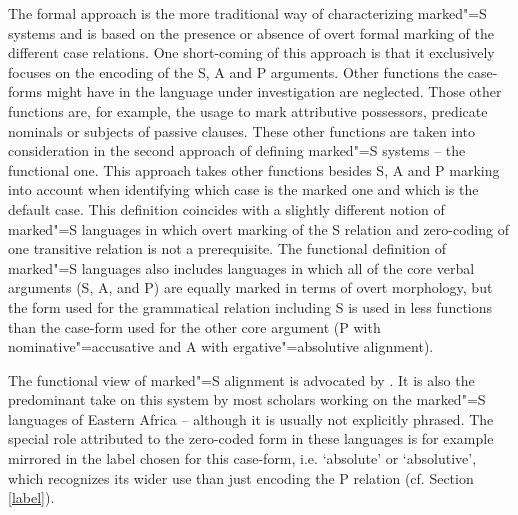 The formal approach is the more traditional way of characterizing marked"=S systems and is based on the presence or absence of overt formal marking of the different case relations. 
One short-coming of this approach is that it exclusively focuses on the encoding of the S, A and P arguments. Other functions the case-forms might have in the language under investigation are neglected. 
Those other functions are, for example, the usage to mark attributive possessors, predicate nominals or subjects of passive clauses. 
These other functions are taken into consideration in the second approach of defining marked"=S systems -- the functional one. 
This approach takes other functions besides S, A and P marking into account when identifying which case is the marked one and which is the default case. 
This definition coincides with a slightly different notion of marked"=S languages in which overt marking of the S relation and zero-coding of one transitive relation is not a prerequisite. 
The functional definition of marked"=S languages also includes languages in which all of the core verbal arguments (S, A, and P) are equally marked in terms of overt morphology, but the form used for the grammatical relation including S is used in less functions than the case-form used for the other core argument (P with nominative"=accusative and A with ergative"=absolutive alignment). 

The functional view of marked"=S alignment is advocated by \citet{Koenig:2006}. 
It is also the predominant take on this system by most scholars working on the marked"=S languages of Eastern Africa -- although it is usually not explicitly phra\-sed. 
The special role attributed to the zero-coded form in these languages is for example mirrored in the label chosen for this case-form, i.e. `absolute' or `absolutive', which recognizes its wider use than just encoding the P relation (cf. Section \ref{label}).  

